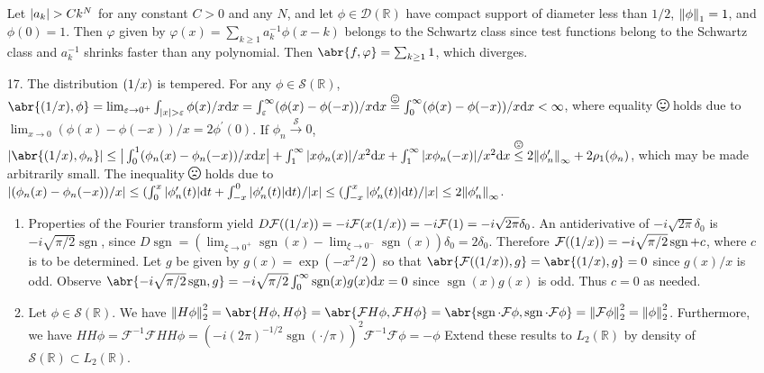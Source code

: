 \documentclass[11pt,leqno]{article}
\theoremstyle{plain}
\theoremstyle{definition}
\numberwithin{equation}{section}
\numberwithin{lem}{section}
\newcommand{\eq}[1]{\overset{#1}{=}}
\let\PV\relax
\DeclareMathOperator{\PV}{PV}
\DeclareMathOperator{\sgn}{sgn}
\newcommand{\smallhappy}{\smiley}
\newcommand{\happy}{\raisebox{-.14em}{\resizebox{1.2em}{!}{\smiley}}}
\newcommand{\smallsad}{\frownie}
\newcommand{\sad}{\raisebox{-.14em}{\resizebox{1.2em}{!}{\frownie}}}
\DeclareMathOperator{\mathhappy}{\!\happy\!}
\DeclareMathOperator{\smallmathhappy}{\!\smallhappy\!}
\DeclareMathOperator{\mathsad}{\!\sad\!}
\DeclareMathOperator{\smallmathsad}{\!\smallsad\!}
\newcommand{\lqq}[1]{\overset{#1}{\leq}}
\begin{document}
\begin{enumerate}
    Let $\abs{a_k}>Ck^N$ for any constant $C>0$ and any $N$, and let $\phi\in \mathcal D(\mathbb R)$ have compact support of diameter less than $1/2$, $\norm{\phi}_1 = 1$, and $\phi(0) = 1$. Then $\varphi$ given by $\varphi(x) = \sum_{k\geq 1}a_k^{-1}\phi(x-k)$ belongs to the Schwartz class since test functions belong to the Schwartz class and $a_k^{-1}$ shrinks faster than any polynomial. Then $\abr{f,\varphi} = \sum_{k\geq 1}1$, which diverges.
    \item[17.] The distribution $\PV(1/x)$ is tempered. For any $\phi\in\mathcal S(\mathbb R)$, $\abr{\PV(1/x),\phi} = \lim_{\varepsilon\to 0^+}\int_{\abs{x}>\varepsilon}\phi(x)/x\dd x = \int_\varepsilon^\infty(\phi(x)-\phi(-x))/x\dd x \eq{\smallmathhappy}\int_0^\infty (\phi(x)-\phi(-x))/x\dd x < \infty$, where equality $\mathhappy$ holds due to $\lim_{x\to 0}(\phi(x)-\phi(-x))/x = 2\phi^\prime(0)$.
    \sloppy If $\phi_n\xrightarrow{\mathcal S}0$, $\abs{\abr{\PV(1/x),\phi_n}}\leq \big|\int_0^1(\phi_n(x)-\phi_n(-x))/x\dd x\big| + \int_1^\infty \abs{x\phi_n(x)}/x^2\dd x + \int_1^\infty\abs{x\phi_n(-x)}/x^2\dd x\lqq{\smallmathsad} 2\norm{\phi_n^\prime}_\infty + 2\rho_1(\phi_n)$, which may be made arbitrarily small. The inequality $\mathsad$ holds due to $\abs{(\phi_n(x)-\phi_n(-x))/x}\leq (\int_0^x\abs{\phi_n^\prime(t)}\dd t + \int_{-x}^0\abs{\phi_n^\prime(t)}\dd t)/\abs{x}\leq (\int_{-x}^x\abs{\phi_n^\prime(t)}\dd t)/\abs{x}\leq 2\norm{\phi_n^\prime}_\infty$. \begin{enumerate}
        \item Properties of the Fourier transform yield $D\mathcal F(\PV(1/x))= -i\mathcal F(x\PV(1/x)) = -i\mathcal F(1) = -i\sqrt{2\pi}\delta_0$. An antiderivative of $-i\sqrt{2\pi}\delta_0$ is $-i\sqrt{\pi/2}\sgn$, since $D\sgn = (\lim_{\xi\to 0^+}\sgn(x) - \lim_{\xi\to 0^-}\sgn(x))\delta_0 = 2\delta_0$. Therefore $\mathcal F(\PV(1/x)) = -i\sqrt{\pi/2}\sgn + c$, where $c$ is to be determined. Let $g$ be given by $g(x) = \exp(-x^2/2)$ so that $\abr{\mathcal F(\PV(1/x)),g} = \abr{\PV(1/x),g} = 0$ since $g(x)/x$ is odd. Observe $\abr{-i\sqrt{\pi/2}\sgn,g}= -i\sqrt{\pi/2}\int_0^\infty \sgn(x)g(x)\dd x = 0$ since $\sgn(x)g(x)$ is odd. Thus $c = 0$ as needed.
        \item Let $\phi\in \mathcal S(\mathbb R)$. We have $\norm{H\phi}_2^2 = \abr{H\phi,H\phi} = \abr{\mathcal FH\phi,\mathcal FH\phi} = \abr{\sgn\cdot\mathcal F\phi,\sgn\cdot\mathcal F\phi} = \norm{\mathcal F\phi}_2^2 = \norm{\phi}_2^2$. Furthermore, we have $HH\phi = \mathcal F^{-1}\mathcal FHH\phi = (-i(2\pi)^{-1/2}\sgn(\cdot/\pi))^2\mathcal F^{-1}\mathcal F\phi = -\phi$ Extend these results to $L_2(\mathbb R)$ by density of $\mathcal S(\mathbb R)\subset L_2(\mathbb R)$.

\end{enumerate}
\end{enumerate}
\end{document}
